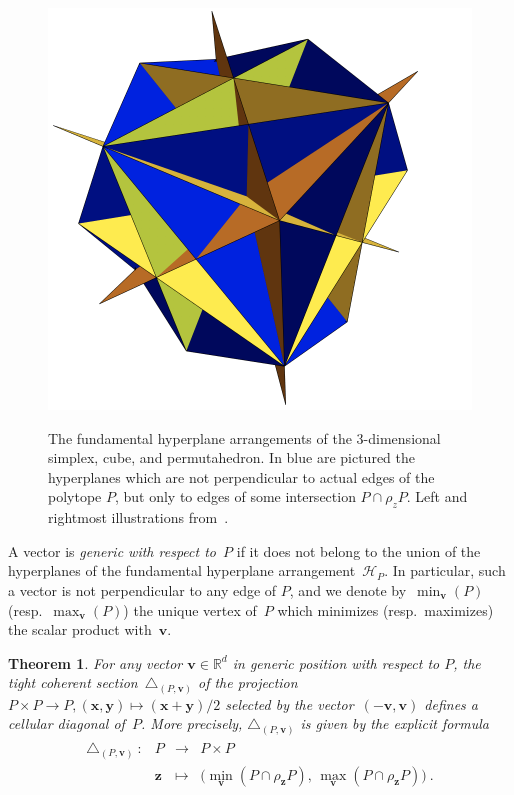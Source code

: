 \documentclass{amsart}
\newcommand{\darkblue}{\color{darkblue}} %
\newtheorem{theorem}{Theorem}[section]
\theoremstyle{definition}
\newcommand{\R}{\mathbb{R}} %
\renewcommand{\b}[1]{{\boldsymbol{#1}}} %
\newcommand{\defn}[1]{\textsl{\darkblue #1}} %
\renewcommand{\b}[1]{\boldsymbol{#1}} %
\begin{document}
\begin{figure}[p]
{		\includegraphics[scale=.3]{HypPermuto.png}
	}
	\caption{The fundamental hyperplane arrangements of the $3$-dimensional simplex, cube, and permutahedron.
    In blue are pictured the hyperplanes which are not perpendicular to actual edges of the polytope $P$, but only to edges of some intersection $P\cap \rho_z P$. 
    Left and rightmost illustrations from~\cite[Fig.~12]{LA21}.}
	\label{fig:examplesHyperplanes}
\end{figure}

A vector is \defn{generic with respect to~$P$} if it does not belong to the union of the hyperplanes of the fundamental hyperplane arrangement~$\mathcal{H}_P$.
In particular, such a vector is not perpendicular to any edge of $P$, and we denote by~$\min_{\b{v}}(P)$ (resp.~$\max_{\b{v}}(P)$) the unique vertex of~$P$ which minimizes (resp.~maximizes) the scalar product with~$\b{v}$. 

\begin{theorem}
    \label{thm:diagonal}
    For any vector $\b{v} \in \R^d$ in generic position with respect to $P$, the tight coherent section~$\triangle_{(P,\b{v})}$ of the projection $P \times P \to P, (\b{x}, \b{y}) \mapsto (\b{x}+\b{y})/2$ selected by the vector~$(-\b{v}, \b{v})$ defines a cellular diagonal of~$P$.
    More precisely, $\triangle_{(P,\b{v})}$ is given by the explicit formula
    \begin{align*}
    \begin{array}{rlcl}
        \triangle_{(P,\b{v})}\ : & P & \to & P\times P \\
        & \b{z} & \mapsto & \bigl( \min_{\b{v}}(P\cap \rho_{\b{z}} P), \, \max_{\b{v}}(P\cap \rho_{\b{z}} P) \bigr) \ .
    \end{array}
    \end{align*}
\end{theorem}
\end{document}
